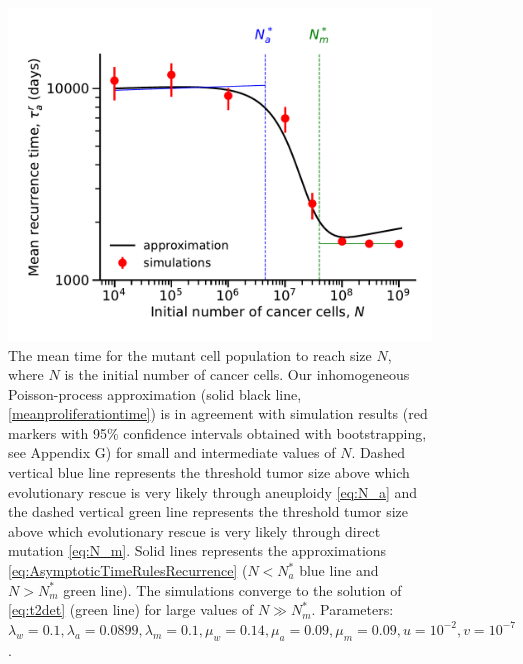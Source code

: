 \documentclass[12pt]{extarticle}
\begin{document}
\begin{figure}
\vspace*{1\baselineskip}
\includegraphics[width=1\textwidth]{Figures/ProliferationTimeLarge.pdf}
\caption{The mean time for the mutant cell population to reach size $N$, where $N$ is the initial number of cancer cells.
Our inhomogeneous Poisson-process approximation (solid black line, \cref{meanproliferationtime}) is in agreement with simulation results (red markers with 95\% confidence intervals obtained with bootstrapping, see Appendix G) for small and intermediate values of $N$. Dashed vertical blue line represents the threshold tumor size above which evolutionary rescue is very likely through aneuploidy \cref{eq:N_a} and the dashed vertical green line represents the threshold tumor size above which evolutionary rescue is very likely through direct mutation \cref{eq:N_m}. Solid lines represents the approximations \cref{eq:AsymptoticTimeRulesRecurrence} ($N<N_a^*$ blue line and $N>N_m^*$ green line). The simulations converge to the solution of \cref{eq:t2det} (green line) for large values of $N\gg N_m^*$.  Parameters: $\lambda_w=0.1,\lambda_a=0.0899,\lambda_m=0.1,\mu_w=0.14,\mu_a=0.09,\mu_m=0.09, u=10^{-2}, v=10^{-7}$.}
\label{ProliferationTimeLarge}
\end{figure}
\end{document}
